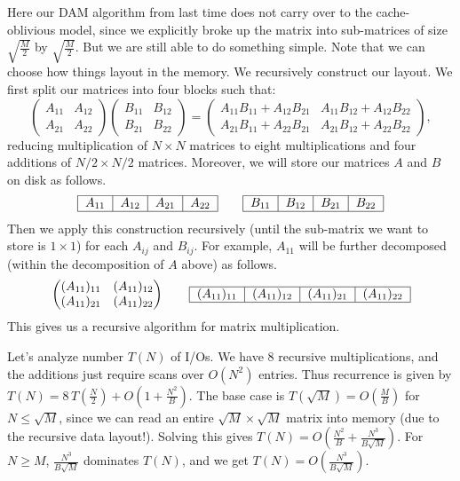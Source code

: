 \documentclass[11pt]{article}
\begin{document}
Here our DAM algorithm from last time does not carry over to the
cache-oblivious model, since we explicitly broke up the matrix into
sub-matrices of size $\sqrt{\frac{M}{2}}$ by $\sqrt{\frac{M}{2}}$. But we are still able to do
something simple. Note that we can choose how things layout in the memory. 
We recursively construct our layout. We first split our matrices into four blocks such that:
\[
\begin{pmatrix}
  A_{11} & A_{12} \\ A_{21} & A_{22}
\end{pmatrix}
\begin{pmatrix}
  B_{11} & B_{12} \\ B_{21} & B_{22}
\end{pmatrix}
=
\begin{pmatrix}
  A_{11}B_{11} + A_{12}B_{21} & A_{11}B_{12} + A_{12}B_{22}
  \\ A_{21}B_{11} + A_{22}B_{21} & A_{21}B_{12} + A_{22}B_{22}
\end{pmatrix},
\]
reducing multiplication of $N \times N$ matrices to eight
multiplications and four additions of $N/2 \times N/2$
matrices. Moreover, we will store our matrices $A$ and $B$ on disk as
follows.
\[
\begin{tabular}{|c|c|c|c|}
  \hline
  $A_{11}$ & $A_{12}$ & $A_{21}$ & $A_{22}$ \\
  \hline
\end{tabular}
\quad\quad
\begin{tabular}{|c|c|c|c|}
  \hline
  $B_{11}$ & $B_{12}$ & $B_{21}$ & $B_{22}$ \\
  \hline
\end{tabular}
\]
Then we apply this construction recursively (until the sub-matrix we want to store is $1\times 1$) for each $A_{ij}$ and
$B_{ij}$. For example, $A_{11}$ will be further decomposed (within the
decomposition of $A$ above) as follows.
\[
\begin{pmatrix}
  (A_{11})_{11} & (A_{11})_{12} \\ (A_{11})_{21} & (A_{11})_{22}
\end{pmatrix}
\quad\quad
\begin{tabular}{|c|c|c|c|}
  \hline $(A_{11})_{11}$ & $(A_{11})_{12}$ & $(A_{11})_{21}$ &
  $(A_{11})_{22}$ \\ \hline
\end{tabular}
\]
This gives us a recursive algorithm for matrix multiplication.

Let's analyze number $T(N)$ of I/Os. We have $8$ recursive multiplications,
and the additions just require scans over $O(N^2)$ entries. Thus
recurrence is given by $T(N) = 8\,T(\frac{N}{2}) + O(1+\frac{N^2}{B})$. The base
case is $T(\sqrt{M}) = O(\frac{M}{B})$ for $N\le\sqrt{M}$, since we can read an entire $\sqrt{M}
\times \sqrt{M}$ matrix into memory (due to the recursive data
layout!). Solving this gives $T(N) = O(\frac{N^2}{B} + \frac{N^3}{B\sqrt{M}})$.
For $N\ge M$, $\frac{N^3}{B\sqrt{M}}$ dominates $T(N)$, and we get $T(N)=O(\frac{N^3}{B\sqrt{M}})$.
\end{document}
